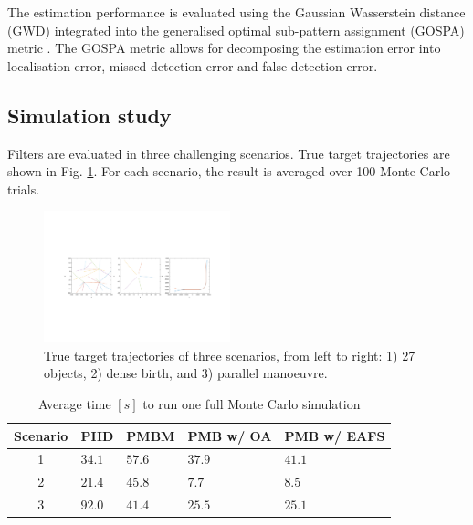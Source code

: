 \documentclass[conference]{IEEEtran}
\begin{document}
The estimation performance is evaluated using the Gaussian Wasserstein distance (GWD) \cite{gwd} integrated into the generalised optimal sub-pattern assignment (GOSPA) metric
\cite{gospa}. The GOSPA metric allows for decomposing the estimation error into localisation error, missed detection error and false detection error. 

\subsection{Simulation study}
Filters are evaluated in three challenging scenarios. True target trajectories are shown in Fig. \ref{fig:trajectory}. For each scenario, the result is averaged over 100 Monte Carlo trials.
\begin{figure}[!t]
\centering
\includegraphics[width=0.48\textwidth]{trajectory}
\caption{True target trajectories of three scenarios, from left to right: 1) 27 objects, 2) dense birth, and 3) parallel manoeuvre.}
\label{fig:trajectory}
\end{figure}
\begin{table}[!b]
\caption{Average time $[s]$ to run one full Monte Carlo simulation}
\label{tab:CycleTimes}
	\centering
	\begin{tabular}{c | l l l l}
		Scenario & PHD & PMBM & PMB w/ OA & PMB w/ EAFS  \\
		\hline
		1   & $34.1$ & $57.6$ & $37.9$ & $41.1$ \\
		2 & $21.4$ & $45.8$ & $7.7$ & $8.5$ \\
		3 & $92.0$ & $41.4$ & $25.5$ & $25.1$
	\end{tabular}
\end{table}
\end{document}
